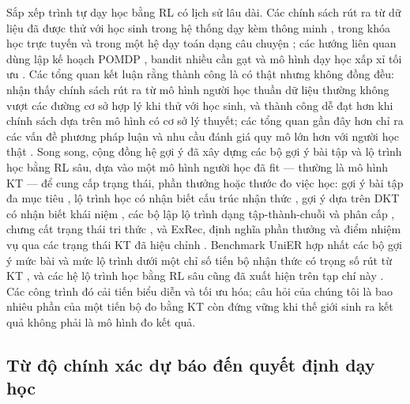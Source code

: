 \documentclass[a4paper,preprint,12pt,authoryear]{elsarticle}
\begin{document}
Sắp xếp trình tự dạy học bằng RL có lịch sử lâu dài. Các chính sách rút ra từ dữ liệu đã được thử với học sinh trong hệ thống dạy kèm thông minh \citep{chi2011umuai,shen2018jedm,zhou2022hrl}, trong khóa học trực tuyến \citep{bassen2020chi} và trong một hệ dạy toán dạng câu chuyện \citep{ruan2024rltutor}; các hướng liên quan dùng lập kế hoạch POMDP \citep{rafferty2016pomdp}, bandit nhiều cần gạt \citep{clement2015bandits} và mô hình dạy học xấp xỉ tối ưu \citep{whitehill2018teaching}. Các tổng quan kết luận rằng thành công là có thật nhưng không đồng đều: \citet{doroudi2019reward} nhận thấy chính sách rút ra từ mô hình người học thuần dữ liệu thường không vượt các đường cơ sở hợp lý khi thử với học sinh, và thành công dễ đạt hơn khi chính sách dựa trên mô hình có cơ sở lý thuyết; các tổng quan gần đây hơn chỉ ra các vấn đề phương pháp luận và nhu cầu đánh giá quy mô lớn hơn với người học thật \citep{singla2021rleducation,riedmann2025rlreview}. Song song, cộng đồng hệ gợi ý đã xây dựng các bộ gợi ý bài tập và lộ trình học bằng RL sâu, dựa vào một mô hình người học đã fit — thường là mô hình KT — để cung cấp trạng thái, phần thưởng hoặc thước đo việc học: gợi ý bài tập đa mục tiêu \citep{huang2019dre}, lộ trình học có nhận biết cấu trúc nhận thức \citep{liu2019cseal}, gợi ý dựa trên DKT có nhận biết khái niệm \citep{ai2019cdkt}, các bộ lập lộ trình dạng tập-thành-chuỗi và phân cấp \citep{chen2023src,li2023gehrl}, chưng cất trạng thái tri thức \citep{li2024pksd}, và ExRec, định nghĩa phần thưởng và điểm nhiệm vụ qua các trạng thái KT đã hiệu chỉnh \citep{ozyurt2025exrec}. Benchmark UniER hợp nhất các bộ gợi ý mức bài và mức lộ trình dưới một chỉ số tiến bộ nhận thức có trọng số rút từ KT \citep{cheng2026unier}, và các hệ lộ trình học bằng RL sâu cũng đã xuất hiện trên tạp chí này \citep{ruan2025adaptive}. Các công trình đó cải tiến biểu diễn và tối ưu hóa; câu hỏi của chúng tôi là bao nhiêu phần của một tiến bộ đo bằng KT còn đứng vững khi thế giới sinh ra kết quả không phải là mô hình đo kết quả.

\subsection{Từ độ chính xác dự báo đến quyết định dạy học}
\end{document}
